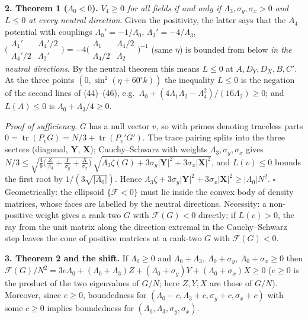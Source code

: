 \documentclass[11pt,a4paper]{article}
\newcommand{\F}{\mathcal F}
\begin{document}
\textbf{2. Theorem 1 ($\Lambda_0<0$).} \emph{$V_4\ge0$ for all fields if and only if $\Lambda_3,\sigma_y,\sigma_x>0$ and $L\le0$
at every neutral direction}. Given the positivity, the latter says that the $A_4$ potential with couplings $\Lambda_0'=-1/\Lambda_0$, $\Lambda_3'=-4/\Lambda_3$,
$\big(\begin{smallmatrix}\Lambda_1'&\Lambda_4'/2\\ \Lambda_4'/2&\Lambda_2'\end{smallmatrix}\big)
=-4\big(\begin{smallmatrix}\Lambda_1&\Lambda_4/2\\ \Lambda_4/2&\Lambda_2\end{smallmatrix}\big)^{-1}$ (same $\eta$) is bounded from below
\emph{in the neutral directions}. By the neutral theorem this means $L\le0$ at $A,D_Y,D_X,B,C'$.
At the three points $(0,\sin^2(\eta+60^\circ k))$ the inequality $L\le0$ is the negation of the second lines of (44)--(46),
e.g.\ $\Lambda_0+(4\Lambda_1\Lambda_2-\Lambda_4^2)/(16\Lambda_2)\ge0$; and $L(A)\le0$ is $\Lambda_0+\Lambda_3/4\ge0$.

\emph{Proof of sufficiency.} $G$ has a null vector $v$, so with primes denoting traceless parts
$0=\operatorname{tr}(P_vG)=N/3+\operatorname{tr}(P_v'G')$. The trace pairing splits into the three sectors
(diagonal, $\mathbf Y$, $\mathbf X$); Cauchy--Schwarz with weights $\Lambda_3,\sigma_y,\sigma_x$ gives
$N/3\le\sqrt{\tfrac49\big(\tfrac Z{\Lambda_3}+\tfrac Y{\sigma_y}+\tfrac X{\sigma_x}\big)}\,
\sqrt{\Lambda_3\zeta(G)+3\sigma_y|\mathbf Y|^2+3\sigma_x|\mathbf X|^2}$, and $L(v)\le0$ bounds the first root by
$1/(3\sqrt{|\Lambda_0|})$. Hence $\Lambda_3\zeta+3\sigma_y|\mathbf Y|^2+3\sigma_x|\mathbf X|^2\ge|\Lambda_0|N^2$. \hfill$\square$\\
Geometrically: the ellipsoid $\{\F<0\}$ must lie inside the convex body of density matrices, whose faces are labelled
by the neutral directions. Necessity: a non-positive weight gives a rank-two $G$ with $\F(G)<0$ directly; if $L(v)>0$,
the ray from the unit matrix along the direction extremal in the Cauchy--Schwarz step leaves the cone of positive
matrices at a rank-two $G$ with $\F(G)<0$.

\textbf{3. Theorem 2 and the shift.} If $\Lambda_0\ge0$ and $\Lambda_0+\Lambda_3,\ \Lambda_0+\sigma_y,\ \Lambda_0+\sigma_x\ge0$ then
$\F(G)/N^2=3e\Lambda_0+(\Lambda_0+\Lambda_3)Z+(\Lambda_0+\sigma_y)Y+(\Lambda_0+\sigma_x)X\ge0$ ($e\ge0$ is the product of the two
eigenvalues of $G/N$; here $Z,Y,X$ are those of $G/N$). Moreover, since $e\ge0$, boundedness for
$(\Lambda_0-c,\Lambda_3+c,\sigma_y+c,\sigma_x+c)$ with some $c\ge0$ implies boundedness for $(\Lambda_0,\Lambda_3,\sigma_y,\sigma_x)$.
\end{document}
